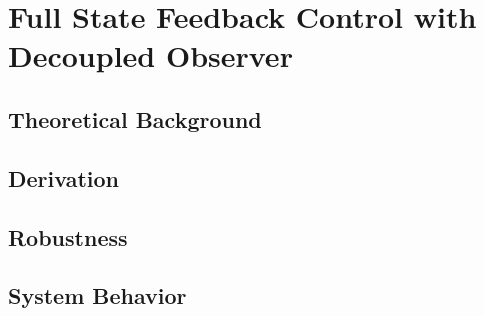 




\section{Full State Feedback Control with Decoupled Observer}

\subsection{Theoretical Background}
\subsection{Derivation}
\subsection{Robustness}
\subsection{System Behavior}
